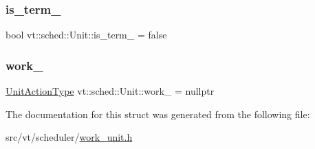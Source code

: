 \subsubsection{\texorpdfstring{is\+\_\+term\+\_\+}{is\_term\_}}
{\footnotesize\ttfamily bool vt\+::sched\+::\+Unit\+::is\+\_\+term\+\_\+ = false\hspace{0.3cm}{\ttfamily [private]}}

\mbox{\label{structvt_1_1sched_1_1_unit_ad1c63e6b9e5f734c1d3a63ca121c4c43}} 
\subsubsection{\texorpdfstring{work\+\_\+}{work\_}}
{\footnotesize\ttfamily \hyperlink{structvt_1_1sched_1_1_unit_a94de9219796a6b3134e5f6f87cc017d8}{Unit\+Action\+Type} vt\+::sched\+::\+Unit\+::work\+\_\+ = nullptr\hspace{0.3cm}{\ttfamily [private]}}



The documentation for this struct was generated from the following file\+:\begin{DoxyCompactItemize}
\item 
src/vt/scheduler/\hyperlink{work__unit_8h}{work\+\_\+unit.\+h}\end{DoxyCompactItemize}
